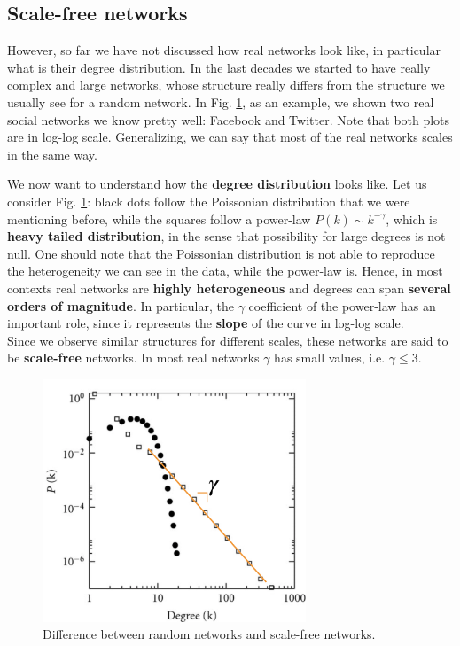 \documentclass[../main/main.tex]{subfiles}
\begin{document}
\subsection{Scale-free networks}

However, so far we have not discussed how real networks look like, in particular what is their degree distribution. In the last decades we started to have really complex and large networks, whose structure really differs from the structure we usually see for a random network. In Fig. \ref{fig:06_4}, as an example, we shown two real social networks we know pretty well: Facebook and Twitter. Note that both plots are in log-log scale. Generalizing, we can say that most of the real networks scales in the same way.

We now want to understand how the \textbf{degree distribution} looks like. Let us consider Fig. \ref{fig:06_4}: black dots follow the Poissonian distribution that we were mentioning before, while the squares follow a power-law \( P(k) \sim k^{- \gamma  } \), which is \textbf{heavy tailed distribution}, in the sense that possibility for large degrees is not null. One should note that the Poissonian distribution is not able to reproduce the heterogeneity we can see in the data, while the power-law is. Hence, in most contexts real networks are \textbf{highly heterogeneous} and degrees can span \textbf{several orders of magnitude}. In particular, the \( \gamma   \) coefficient of the power-law has an important role, since it represents the \textbf{slope} of the curve in log-log scale.\\
Since we observe similar structures for different scales, these networks are said to be \textbf{scale-free} networks. In most real networks $\gamma$ has small values, i.e. \( \gamma \le 3 \).


\begin{figure}[h!]
\centering
\includegraphics[width=0.7\textwidth]{../lessons/image/06/5.png}
\caption{\label{fig:06_4} Difference between random networks and scale-free networks.}
\end{figure}
\end{document}

